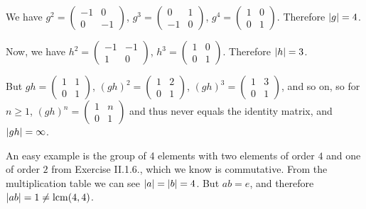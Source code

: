 \begin{solution}
	We have $g^2 =
	\begin{pmatrix}
		-1 & 0\\
		0 & -1
	\end{pmatrix}$, $g^3 =
	\begin{pmatrix}
		0 & 1\\
		-1 & 0
	\end{pmatrix}$, $g^4 =
	\begin{pmatrix}
		1 & 0\\
		0 & 1
	\end{pmatrix}$. Therefore $\left|g\right|=4$.
	
	Now, we have $h^2 =
	\begin{pmatrix}
		-1 & -1\\
		1 & 0
	\end{pmatrix}$, $h^3 =
	\begin{pmatrix}
		1 & 0\\
		0 & 1
	\end{pmatrix}$. Therefore $\left|h\right|=3$.
	
	But $gh =
	\begin{pmatrix}
		1 & 1\\
		0 & 1
	\end{pmatrix}$, $(gh)^2 =
	\begin{pmatrix}
		1 & 2\\
		0 & 1
	\end{pmatrix}$, $(gh)^3 =
	\begin{pmatrix}
		1 & 3\\
		0 & 1
	\end{pmatrix}$, and so on, so for $n \geq 1$, $(gh)^n =
	\begin{pmatrix}
		1 & n\\
		0 & 1
	\end{pmatrix}$ and thus never equals the identity matrix, and $\left|gh\right|=\infty$.
\end{solution}

\begin{problem}
\end{problem}

\begin{solution}
	An easy example is the group of 4 elements with two elements of order $4$ and one of order $2$ from Exercise II.1.6., which we know is commutative. From the multiplication table we can see $\left|a\right| = \left|b\right| = 4$. But $ab = e$, and therefore $\left|ab\right| = 1 \neq \operatorname{lcm}(4, 4)$.
\end{solution}

